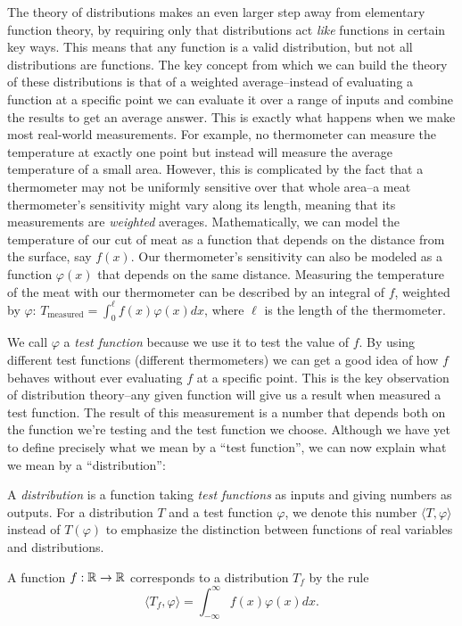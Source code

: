   The theory of distributions makes an even larger step away from elementary function theory, by requiring only that distributions act \emph{like} functions in certain key ways.
  This means that any function is a valid distribution, but not all distributions are functions.
  The key concept from which we can build the theory of these distributions is that of a weighted average--instead of evaluating a function at a specific point we can evaluate it over a range of inputs and combine the results to get an average answer.
  This is exactly what happens when we make most real-world measurements.
  For example, no thermometer can measure the temperature at exactly one point but instead will measure the average temperature of a small area.
  However, this is complicated by the fact that a thermometer may not be uniformly sensitive over that whole area--a meat thermometer's sensitivity might vary along its length, meaning that its measurements are \emph{weighted} averages. 
  Mathematically, we can model the temperature of our cut of meat as a function that depends on the distance from the surface, say $f(x)$.
  Our thermometer's sensitivity can also be modeled as a function $\varphi(x)$ that depends on the same distance.
  Measuring the temperature of the meat with our thermometer can be described by an integral of $f$, weighted by $\varphi$: $T_\text{measured} = \int_0^\ell f(x)\varphi(x) dx$, where $\ell$ is the length of the thermometer. %

  We call $\varphi$ a \emph{test function} because we use it to test the value of $f$.
  By using different test functions (different thermometers) we can get a good idea of how $f$ behaves without ever evaluating $f$ at a specific point.
  This is the key observation of distribution theory--any given function will give us a result when measured a test function.
  The result of this measurement is a number that depends both on the function we're testing and the test function we choose.
  Although we have yet to define precisely what we mean by a ``test function'', we can now explain what we mean by a ``distribution'':

  \begin{defn}[Distribution]
    A \emph{distribution} is a function taking \emph{test functions} as inputs and giving numbers as outputs.
    For a distribution $T$ and a test function $\varphi$, we denote this number $\langle T, \varphi \rangle$ instead of $T(\varphi)$ to emphasize the distinction between functions of real variables and distributions.

    A function $f:\mathbb{R}\rightarrow\mathbb{R}$ corresponds to a distribution $T_f$ by the rule
    \begin{equation*}
      \langle T_f, \varphi \rangle = \int_{-\infty}^{\infty} f(x)\varphi(x)dx \text{.}
    \end{equation*}

  \end{defn}

